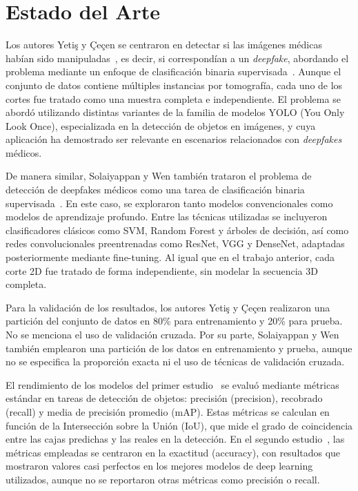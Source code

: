 \documentclass[conference]{IEEEtran}
\begin{document}
\section{Estado del Arte}

Los autores Yetiş y Çeçen se centraron en detectar si las imágenes médicas habían sido manipuladas~\cite{yetis2024}, es decir, si correspondían a un \textit{deepfake}, abordando el problema mediante un enfoque de clasificación binaria supervisada~\cite{yetis2024}. Aunque el conjunto de datos contiene múltiples instancias por tomografía, cada uno de los cortes fue tratado como una muestra completa e independiente. El problema se abordó utilizando distintas variantes de la familia de modelos YOLO (You Only Look Once), especializada en la detección de objetos en imágenes, y cuya aplicación ha demostrado ser relevante en escenarios relacionados con \textit{deepfakes} médicos.

De manera similar, Solaiyappan y Wen también trataron el problema de detección de deepfakes médicos como una tarea de clasificación binaria supervisada~\cite{solaiyappan2022}. En este caso, se exploraron tanto modelos convencionales como modelos de aprendizaje profundo. Entre las técnicas utilizadas se incluyeron clasificadores clásicos como SVM, Random Forest y árboles de decisión, así como redes convolucionales preentrenadas como ResNet, VGG y DenseNet, adaptadas posteriormente mediante fine-tuning. Al igual que en el trabajo anterior, cada corte 2D fue tratado de forma independiente, sin modelar la secuencia 3D completa.

Para la validación de los resultados, los autores Yetiş y Çeçen realizaron una partición del conjunto de datos en 80\% para entrenamiento y 20\% para prueba. No se menciona el uso de validación cruzada. Por su parte, Solaiyappan y Wen también emplearon una partición de los datos en entrenamiento y prueba, aunque no se especifica la proporción exacta ni el uso de técnicas de validación cruzada.

El rendimiento de los modelos del primer estudio~\cite{yetis2024} se evaluó mediante métricas estándar en tareas de detección de objetos: precisión (precision), recobrado (recall) y media de precisión promedio (mAP). Estas métricas se calculan en función de la Intersección sobre la Unión (IoU), que mide el grado de coincidencia entre las cajas predichas y las reales en la detección. En el segundo estudio~\cite{solaiyappan2022}, las métricas empleadas se centraron en la exactitud (accuracy), con resultados que mostraron valores casi perfectos en los mejores modelos de deep learning utilizados, aunque no se reportaron otras métricas como precisión o recall.
\end{document}
